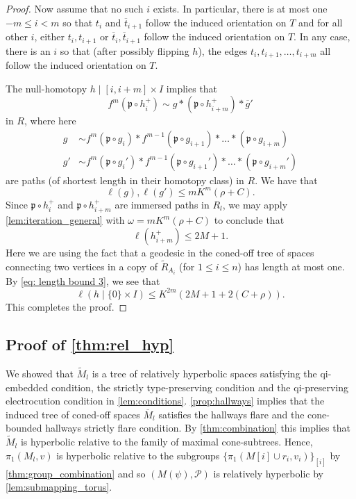 \documentclass[11pt, a4paper]{amsart}
\theoremstyle{definition}
\DeclareMathOperator{\len}{\ell}
\begin{document}
\begin{proof}
Now assume that no such $i$ exists. In particular, there is at most one $-m\leqslant i< m$ so that $t_i$ and $\overline{t}_{i+1}$ follow the induced orientation on $T$ and for all other $i$, either $t_i, t_{i+1}$ or $\overline{t}_i, \overline{t}_{i+1}$ follow the induced orientation on $T$. In any case, there is an $i$ so that (after possibly flipping $h$), the edges $t_i, t_{i+1}, \ldots, t_{i+m}$ all follow the induced orientation on $T$.

The null-homotopy $h\mid[i, i+m]\times I$ implies that
\[
f^m(\mathfrak{p}\circ h_i^+) \sim g*(\mathfrak{p}\circ h_{i+m}^+)*\overline{g}'
\]
in $R$, where here
\begin{align*}
g &\sim f^m(\mathfrak{p}\circ g_{i})*f^{m-1}(\mathfrak{p}\circ g_{i+1})*\ldots *(\mathfrak{p}\circ g_{i+m})\\
g' &\sim f^m(\mathfrak{p}\circ g_i')*f^{m-1}(\mathfrak{p}\circ g_{i+1}')*\ldots *(\mathfrak{p}\circ g_{i+m}')
\end{align*}
are paths (of shortest length in their homotopy class) in $R$. We have that
\[
\len(g), \len(g') \leqslant mK^m(\rho+C).
\]
Since $\mathfrak{p}\circ h_i^+$ and $\mathfrak{p}\circ h_{i+m}^+$ are immersed paths in $R_{l}$, we may apply \cref{lem:iteration_general} with $\omega = mK^m(\rho+C)$ to conclude that 
\[
\len(h_{i+m}^+)\leqslant 2M + 1.
\]
Here we are using the fact that a geodesic in the coned-off tree of spaces connecting two vertices in a copy of $\widetilde{R}_{A_i}$ (for $1\leqslant i\leqslant n$) has length at most one. By \eqref{eq: length bound 3}, we see that
\[
\len(h\mid \{0\}\times I)\leqslant K^{2m}(2M+1 + 2(C+\rho)). 
\]
This completes the proof.
\end{proof}



\subsection{Proof of \cref{thm:rel_hyp}}


We showed that $\widetilde{M}_{l}$ is a tree of relatively hyperbolic spaces satisfying the qi-embedded condition, the strictly type-preserving condition and the qi-preserving electrocution condition in \cref{lem:conditions}. \cref{prop:hallways} implies that the induced tree of coned-off spaces $\overline{M}_l$ satisfies the hallways flare and the cone-bounded hallways strictly flare condition. By \cref{thm:combination} this implies that $\widetilde{M}_{l}$ is hyperbolic relative to the family of maximal cone-subtrees. Hence, $\pi_1(M_{l}, v)$ is hyperbolic relative to the subgroups $\{\pi_1(M[i]\cup r_i, v_i)\}_{[i]}$ by \cref{thm:group_combination} and so $(M(\psi), \mathcal{P})$ is relatively hyperbolic by \cref{lem:submapping_torus}.
\end{document}
